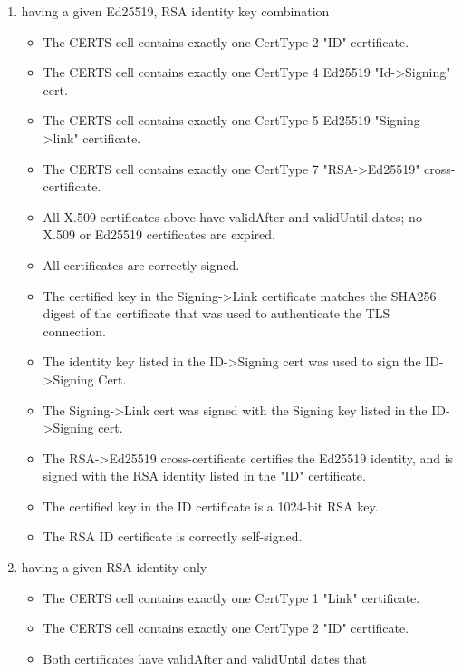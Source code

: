 \begin{enumerate}
    \item having a given Ed25519, RSA identity key combination
        \begin{itemize}
            \item The CERTS cell contains exactly one CertType 2 "ID" certificate.
            \item The CERTS cell contains exactly one CertType 4 Ed25519
            "Id->Signing" cert.
            \item The CERTS cell contains exactly one CertType 5 Ed25519
            "Signing->link" certificate.
            \item The CERTS cell contains exactly one CertType 7 "RSA->Ed25519"
            cross-certificate.
            \item All X.509 certificates above have validAfter and validUntil dates;
            no X.509 or Ed25519 certificates are expired.
            \item All certificates are correctly signed.
            \item The certified key in the Signing->Link certificate matches the
            SHA256 digest of the certificate that was used to
            authenticate the TLS connection.
            \item The identity key listed in the ID->Signing cert was used to
            sign the ID->Signing Cert.
            \item The Signing->Link cert was signed with the Signing key listed
            in the ID->Signing cert.
            \item The RSA->Ed25519 cross-certificate certifies the Ed25519
            identity, and is signed with the RSA identity listed in the
            "ID" certificate.
            \item The certified key in the ID certificate is a 1024-bit RSA key.
            \item The RSA ID certificate is correctly self-signed. 
        \end{itemize}
    \item having a given RSA identity only
        \begin{itemize}
            \item The CERTS cell contains exactly one CertType 1 "Link" certificate.
            \item The CERTS cell contains exactly one CertType 2 "ID" certificate.
            \item Both certificates have validAfter and validUntil dates that

\end{itemize}
\end{enumerate}
